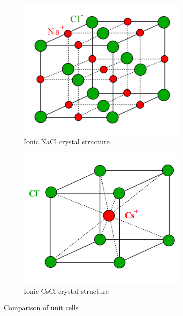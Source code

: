 \begin{figure}[ht!]
\begin{subfigure}[t]{0.24\linewidth}
        \includegraphics[width=0.9\textwidth]{images/nacl.png}
        \caption{Ionic NaCl crystal structure}
    \end{subfigure}  
    \begin{subfigure}[t]{0.24\linewidth}
        \centering
        \includegraphics[width=0.9\textwidth]{images/cscl.png}
        \caption{Ionic CsCl crystal structure}
    \end{subfigure}     
    \caption{Comparison of unit cells}
\end{figure}

